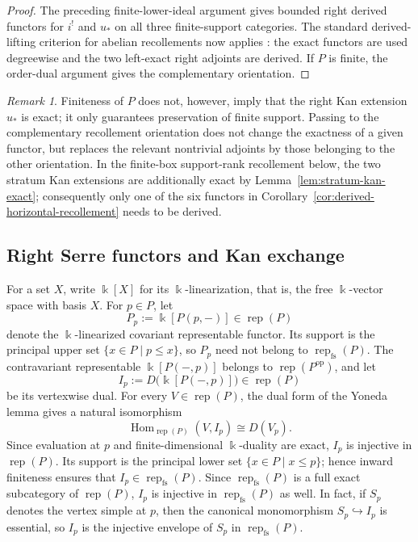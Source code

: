 \documentclass[12pt,reqno]{amsart}
\theoremstyle{definition}
\theoremstyle{remark}
\newtheorem{remark}[theorem]{Remark}
\newcommand{\Rep}{\operatorname{rep}}
\newcommand{\Hom}{\operatorname{Hom}}
\begin{document}
\begin{proof}
The preceding finite-lower-ideal argument gives bounded right derived functors
for $i^!$ and $u_*$ on all three finite-support categories.  The standard
derived-lifting criterion for abelian recollements now applies
\cite{Psaroudakis}: the exact functors are used degreewise and the two
left-exact right adjoints are derived.  If $P$ is finite, the order-dual
argument gives the complementary orientation.
\end{proof}

\begin{remark}\label{rem:finite-kan-not-exact}
Finiteness of $P$ does not, however, imply that the right Kan extension $u_*$
is exact; it only guarantees preservation of finite support.  Passing to the
complementary recollement orientation does not change the exactness of a given
functor, but replaces the relevant nontrivial adjoints by those belonging to
the other orientation.  In the finite-box support-rank recollement below, the
two stratum Kan extensions are additionally exact by
Lemma~\ref{lem:stratum-kan-exact}; consequently only one of the six functors
in Corollary~\ref{cor:derived-horizontal-recollement} needs to be derived.
\end{remark}

\subsection{Right Serre functors and Kan exchange}

For a set $X$, write $\Bbbk[X]$ for its $\Bbbk$-linearization, that is, the
free $\Bbbk$-vector space with basis $X$.  For $p\in P$, let
\[
P_p:=\Bbbk[P(p,-)]\in\Rep(P)
\]
denote the $\Bbbk$-linearized covariant representable functor.  Its support is
the principal upper set $\{x\in P\mid p\le x\}$, so $P_p$ need not belong to
$\Rep_{\mathrm{fs}}(P)$.  The contravariant representable
$\Bbbk[P(-,p)]$ belongs to $\Rep(P^{\mathrm{op}})$, and let
\[
I_p:=D\!\bigl(\Bbbk[P(-,p)]\bigr)\in\Rep(P)
\]
be its vertexwise dual.  For every $V\in\Rep(P)$, the dual form of the
Yoneda lemma gives a natural isomorphism
\[
\Hom_{\Rep(P)}(V,I_p)\cong D(V_p).
\]
Since evaluation at $p$ and finite-dimensional $\Bbbk$-duality are exact,
$I_p$ is injective in $\Rep(P)$.  Its support is the principal lower set
$\{x\in P\mid x\le p\}$; hence inward finiteness ensures that
$I_p\in\Rep_{\mathrm{fs}}(P)$.  Since $\Rep_{\mathrm{fs}}(P)$ is a full
exact subcategory of $\Rep(P)$, $I_p$ is injective in
$\Rep_{\mathrm{fs}}(P)$ as well.  In fact, if $S_p$ denotes the vertex
simple at $p$, then the canonical monomorphism $S_p\hookrightarrow I_p$ is
essential, so $I_p$ is the injective envelope of $S_p$ in
$\Rep_{\mathrm{fs}}(P)$.
\end{document}
